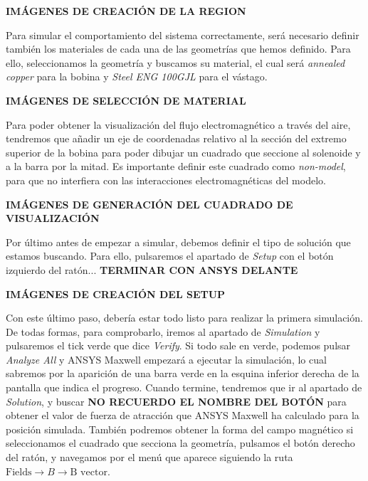 \textbf{IMÁGENES DE CREACIÓN DE LA REGION}

Para simular el comportamiento del sistema correctamente, será necesario definir también los materiales de cada una de las geometrías que hemos definido. Para ello, seleccionamos la geometría y buscamos su material, el cual será \textit{annealed copper} para la bobina y \textit{Steel ENG 100GJL} para el vástago.

\textbf{IMÁGENES DE SELECCIÓN DE MATERIAL}

Para poder obtener la visualización del flujo electromagnético a través del aire, tendremos que añadir un eje de coordenadas relativo al la sección del extremo superior de la bobina para poder dibujar un cuadrado que seccione al solenoide y a la barra por la mitad. Es importante definir este cuadrado como \textit{non-model}, para que no interfiera con las interacciones electromagnéticas del modelo. 

\textbf{IMÁGENES DE GENERACIÓN DEL CUADRADO DE VISUALIZACIÓN}


Por último antes de empezar a simular, debemos definir el tipo de solución que estamos buscando. Para ello, pulsaremos el apartado de \textit{Setup} con el botón izquierdo del ratón... \textbf{TERMINAR CON ANSYS DELANTE}

\textbf{IMÁGENES DE CREACIÓN DEL SETUP}

Con este último paso, debería estar todo listo para realizar la primera simulación. De todas formas, para comprobarlo, iremos al apartado de \textit{Simulation} y pulsaremos el tick verde que dice \textit{Verify}. Si todo sale en verde, podemos pulsar \textit{Analyze All} y ANSYS Maxwell\textsuperscript{\textregistered} empezará a ejecutar la simulación, lo cual sabremos por la aparición de una barra verde en la esquina inferior derecha de la pantalla que indica el progreso. Cuando termine, tendremos que ir al apartado de \textit{Solution}, y buscar \textbf{NO RECUERDO EL NOMBRE DEL BOTÓN} para obtener el valor de fuerza de atracción que ANSYS Maxwell\textsuperscript{\textregistered} ha calculado para la posición simulada. También podremos obtener la forma del campo magnético si seleccionamos el cuadrado que secciona la geometría, pulsamos el botón derecho del ratón, y navegamos por el menú que aparece siguiendo la ruta \(\text{Fields} \rightarrow B \rightarrow \text{B vector}\).